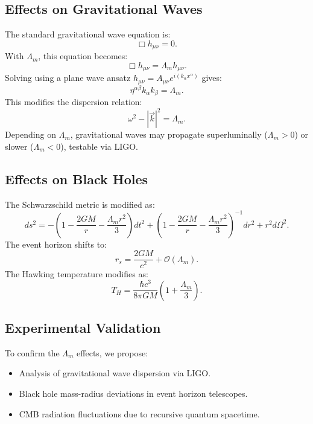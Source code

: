 \documentclass{article}
\theoremstyle{plain}
\begin{document}
\subsection{Effects on Gravitational Waves}
The standard gravitational wave equation is:
\begin{equation}
    \Box h_{\mu\nu} = 0.
\end{equation}
With $\Lambda_m$, this equation becomes:
\begin{equation}
    \Box h_{\mu\nu} = \Lambda_m h_{\mu\nu}.
\end{equation}
Solving using a plane wave ansatz $h_{\mu\nu} = A_{\mu\nu} e^{i (k_\alpha x^\alpha)}$ gives:
\begin{equation}
    \eta^{\alpha\beta} k_\alpha k_\beta = \Lambda_m.
\end{equation}
This modifies the dispersion relation:
\begin{equation}
    \omega^2 - |\vec{k}|^2 = \Lambda_m.
\end{equation}
Depending on $\Lambda_m$, gravitational waves may propagate superluminally ($\Lambda_m > 0$) or slower ($\Lambda_m < 0$), testable via LIGO.

\subsection{Effects on Black Holes}
The Schwarzschild metric is modified as:
\begin{equation}
    ds^2 = -\left(1 - \frac{2GM}{r} - \frac{\Lambda_m r^2}{3} \right) dt^2 + \left(1 - \frac{2GM}{r} - \frac{\Lambda_m r^2}{3} \right)^{-1} dr^2 + r^2 d\Omega^2.
\end{equation}
The event horizon shifts to:
\begin{equation}
    r_s = \frac{2GM}{c^2} + \mathcal{O}(\Lambda_m).
\end{equation}
The Hawking temperature modifies as:
\begin{equation}
    T_H = \frac{\hbar c^3}{8\pi G M} \left(1 + \frac{\Lambda_m}{3} \right).
\end{equation}

\subsection{Experimental Validation}
To confirm the $\Lambda_m$ effects, we propose:
\begin{itemize}
    \item Analysis of gravitational wave dispersion via LIGO.
    \item Black hole mass-radius deviations in event horizon telescopes.
    \item CMB radiation fluctuations due to recursive quantum spacetime.
\end{itemize}
\end{document}
